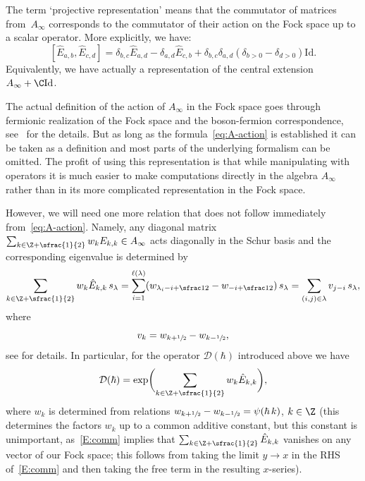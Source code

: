 The term `projective representation' means that the commutator of matrices from~$A_\infty$ corresponds to the commutator of their action on the Fock space up to a scalar operator. More explicitly, we have:
\begin{equation}
\label{E:comm}
[\hat E_{a,b},\hat E_{c,d}] = \delta_{b,c}\hat E_{a,d} - \delta_{a,d}\hat E_{c,b}+\delta_{b,c}\delta_{a,d}(\delta_{b>0}-\delta_{d>0})\mathrm{Id}.
\end{equation}
Equivalently, we have actually a representation of the central extension $A_{\infty}+\C\mathrm{Id}$.

The actual definition of the action of $A_\infty$ in the Fock space goes through fermionic realization of the Fock space and the boson-fermion correspondence, see~\cite[\S\S5 \&~6]{MiwaJimboDate} for the details. But as long as the formula~\eqref{eq:A-action} is established it can be taken as a definition and most parts of the underlying formalism can be omitted. The profit of using this representation is that while manipulating with operators it is much easier to make computations directly in the algebra $A_\infty$ rather than in its more complicated representation in the Fock space.

However, we will need one more relation that does not follow immediately from~\eqref{eq:A-action}. Namely, any diagonal matrix $\sum_{k\in \Z+\sfrac{1}{2}}w_k E_{k,k}\in A_\infty$ acts diagonally in the Schur basis and the corresponding eigenvalue is determined by
\begin{align}\label{eq:Ewdef}
\sum_{k\in \Z+\sfrac{1}{2}}w_k \hat E_{k,k} \,s_\lambda=\sum_{i=1}^{\ell(\lambda)}(w_{\lambda_i-i+\sfrac12}-w_{-i+\sfrac12})\,s_\lambda=\sum_{(i,j)\in\lambda} v_{j-i}\,s_\lambda,
\end{align}
where
\begin{equation*}
v_k=w_{k+\sfrac12}-w_{k-\sfrac12},
\end{equation*}
see \cite{KazLand} for details. In particular, for the operator $\mathcal{D}(\hbar)$ introduced above we have
\begin{equation*}
\mathcal{D}(\hbar)=\exp\biggl(\sum_{k\in \Z+\sfrac{1}{2}}w_k \hat E_{k,k} \biggr),
\end{equation*}
where $w_k$ is determined from relations $w_{k+\sfrac12}-w_{k-\sfrac12}=\psi(\hbar\,k)$, $k\in\Z$ (this determines the factors $w_k$ up to a common additive constant, but this constant is unimportant, as~\eqref{E:comm} implies that $\sum_{k\in \Z+\sfrac{1}{2}}\hat E_{k,k}$ vanishes on any vector of our Fock space; this follows from taking the limit $y\rightarrow x$ in the RHS of~\eqref{E:comm} and then taking the free term in the resulting $x$-series).

